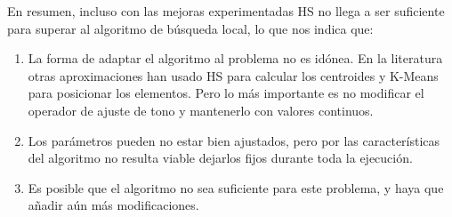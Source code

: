 En resumen, incluso con las mejoras experimentadas HS no llega a ser suficiente para superar al algoritmo de búsqueda local, lo que nos indica que:
\begin{enumerate}
    \item La forma de adaptar el algoritmo al problema no es idónea. En la literatura otras aproximaciones han usado HS para calcular los centroides y K-Means para posicionar los elementos. Pero lo más importante es no modificar el operador de ajuste de tono y mantenerlo con valores continuos.
    \item Los parámetros pueden no estar bien ajustados, pero por las características del algoritmo no resulta viable dejarlos fijos durante toda la ejecución.
    \item Es posible que el algoritmo no sea suficiente para este problema, y haya que añadir aún más modificaciones.
\end{enumerate}





